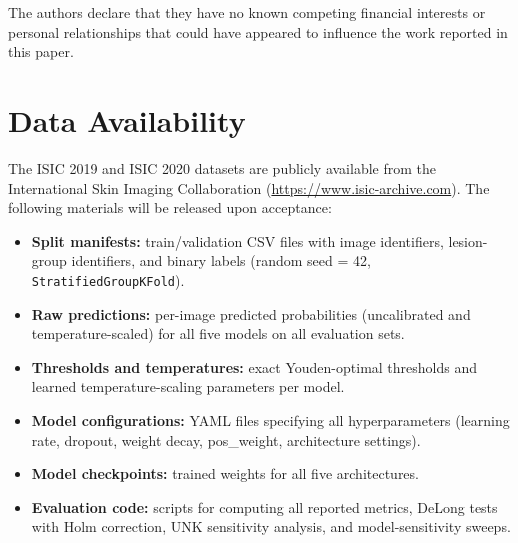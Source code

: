 \documentclass[12pt, a4paper]{article}
\begin{document}
The authors declare that they have no known competing financial interests or personal relationships that could have appeared to influence the work reported in this paper.

\section*{Data Availability}

The ISIC 2019 and ISIC 2020 datasets are publicly available from the International Skin Imaging Collaboration (\url{https://www.isic-archive.com}). The following materials will be released upon acceptance:

\begin{itemize}[nosep]
    \item \textbf{Split manifests:} train/validation CSV files with image identifiers, lesion-group identifiers, and binary labels (random seed = 42, \texttt{StratifiedGroupKFold}).
    \item \textbf{Raw predictions:} per-image predicted probabilities (uncalibrated and temperature-scaled) for all five models on all evaluation sets.
    \item \textbf{Thresholds and temperatures:} exact Youden-optimal thresholds and learned temperature-scaling parameters per model.
    \item \textbf{Model configurations:} YAML files specifying all hyperparameters (learning rate, dropout, weight decay, pos\_weight, architecture settings).
    \item \textbf{Model checkpoints:} trained weights for all five architectures.
    \item \textbf{Evaluation code:} scripts for computing all reported metrics, DeLong tests with Holm correction, UNK sensitivity analysis, and model-sensitivity sweeps.
\end{itemize}


\end{document}
